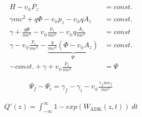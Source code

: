 \documentclass{thesis}
\begin{document}
\begin{align*}
H-v_\mathrm{\phi}P_z&=const.\\
\gamma m c^2+q\Phi-v_\mathrm{\phi}p_z-v_\mathrm{\phi}qA_z&=const.\\
\gamma+\frac{q\Phi}{mc^2}-v_\mathrm{\phi}\frac{p_z}{mc^2}-v_\mathrm{\phi}q\frac{A_z}{mc^2}&=const\\
\gamma-v_\mathrm{\phi}\frac{p_z}{mc^2}-\underbrace{\frac{q}{mc^2}(\Phi-v_\mathrm{\phi}A_z)}_{\Psi}&=const.\\
-const. +\gamma + v_\mathrm{\phi}\frac{p_z}{mc^2}&=\Psi
\end{align*}

\begin{align*}
\Psi_f-\Psi_i=\gamma_f-\gamma_i-v_\mathrm{\phi}\frac{\gamma_f m v_f}{mc^2}
\end{align*}

\begin{align*}
Q'(z)=\int_{-\infty}^{\infty}1- exp(W_\mathrm{ADK}(z,t))\ dt
\end{align*}



    
\end{document}
